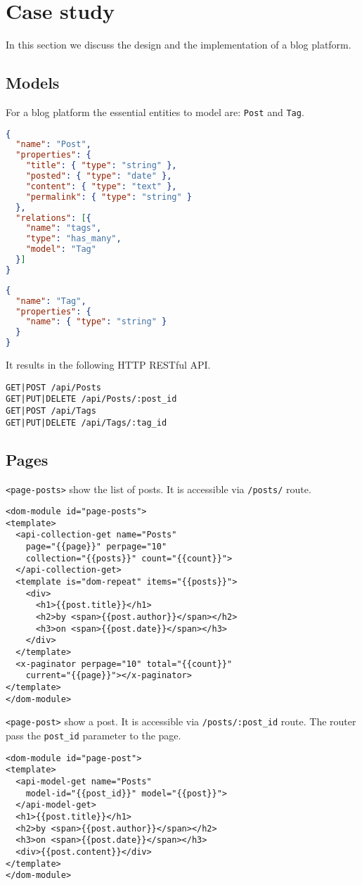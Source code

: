 \section{Case study}
In this section we discuss the design and the implementation of a blog platform. 

\subsection{Models}

For a blog platform the essential entities to model are: \texttt{Post} and \texttt{Tag}.

\begin{lstlisting}[language=json]
{
  "name": "Post",
  "properties": {
    "title": { "type": "string" },
    "posted": { "type": "date" },
    "content": { "type": "text" },
    "permalink": { "type": "string" }
  }, 
  "relations": [{
    "name": "tags", 
    "type": "has_many", 
    "model": "Tag"
  }]
}
\end{lstlisting}

\begin{lstlisting}[language=json]
{
  "name": "Tag",
  "properties": {
    "name": { "type": "string" }
  }
}
\end{lstlisting}

It results in the following HTTP RESTful API.

\begin{lstlisting}
GET|POST /api/Posts
GET|PUT|DELETE /api/Posts/:post_id
GET|POST /api/Tags
GET|PUT|DELETE /api/Tags/:tag_id
\end{lstlisting}

\subsection{Pages}

\texttt{<page-posts>} show the list of posts.
It is accessible via \texttt{/posts/} route.

\begin{lstlisting}[language=HTML5]
<dom-module id="page-posts">
<template>
  <api-collection-get name="Posts"
    page="{{page}}" perpage="10"
    collection="{{posts}}" count="{{count}}">
  </api-collection-get>
  <template is="dom-repeat" items="{{posts}}">
    <div>
      <h1>{{post.title}}</h1>
      <h2>by <span>{{post.author}}</span></h2>
      <h3>on <span>{{post.date}}</span></h3>
    </div>
  </template>
  <x-paginator perpage="10" total="{{count}}" 
    current="{{page}}"></x-paginator>
</template>
</dom-module>
\end{lstlisting}

\texttt{<page-post>} show a post. 
It is accessible via \texttt{/posts/:post\_id} route.
The router pass the \texttt{post\_id} parameter to the page.

\begin{lstlisting}[language=HTML5]
<dom-module id="page-post">
<template>
  <api-model-get name="Posts" 
    model-id="{{post_id}}" model="{{post}}">
  </api-model-get>
  <h1>{{post.title}}</h1>
  <h2>by <span>{{post.author}}</span></h2>
  <h3>on <span>{{post.date}}</span></h3>
  <div>{{post.content}}</div>
</template>
</dom-module>
\end{lstlisting}
